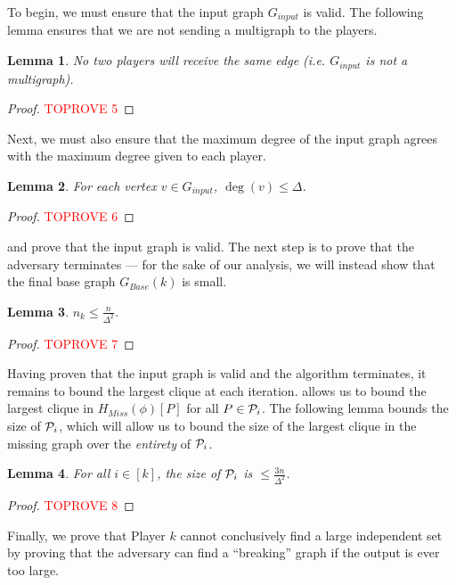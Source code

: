 \documentclass[11pt]{article}
\newtheorem{lemma}{Lemma}[section]
\theoremstyle{definition}
\renewcommand{\leq}{\leqslant}
\renewcommand{\le}{\leq}
\begin{document}
To begin, we must ensure that the input graph $G_{input}$ is valid. The following lemma ensures that we are not sending a multigraph to the players. 

\begin{lemma}\label{graph-is-not-multi}
    No two players will receive the same edge (i.e. $G_{input}$ is not a multigraph).
\end{lemma}
\begin{proof}\textcolor{red}{TOPROVE 5}\end{proof}

Next, we must also ensure that the maximum degree of the input graph agrees with the maximum degree given to each player. 
\begin{lemma}\label{valid-graph}
For each vertex $v\in G_{input}$, $\deg{(v)}\le \Delta$.
\end{lemma}
\begin{proof}\textcolor{red}{TOPROVE 6}\end{proof}

 and  prove that the input graph is valid. The next step is to prove that the adversary terminates --- for the sake of our analysis, we will instead show that the final base graph $G_{Base}(k)$ is small. 

\begin{lemma}\label{algorithm-finishes}
$n_k\le \frac n{\Delta^2}$. 
\end{lemma}
\begin{proof}\textcolor{red}{TOPROVE 7}\end{proof}

Having proven that the input graph is valid and the algorithm terminates, it remains to bound the largest clique at each iteration.  allows us to bound the largest clique in $H_{Miss}(\phi)[P]$ for all $P\in \mathcal{P}_i$. The following lemma bounds the size of $\mathcal{P}_i$, which will allow us to bound the size of the largest clique in the missing graph over the \textit{entirety} of $\mathcal{P}_i$. 

\begin{lemma}\label{bound-on-P_i}
For all $i\in [k]$, the size of $\mathcal{P}_i$ is $\le \frac{3n}{\Delta^2}$. 
\end{lemma}
\begin{proof}\textcolor{red}{TOPROVE 8}\end{proof}

Finally, we prove that Player $k$ cannot conclusively find a large independent set by proving that the adversary can find a ``breaking'' graph if the output is ever too large. 
\end{document}
